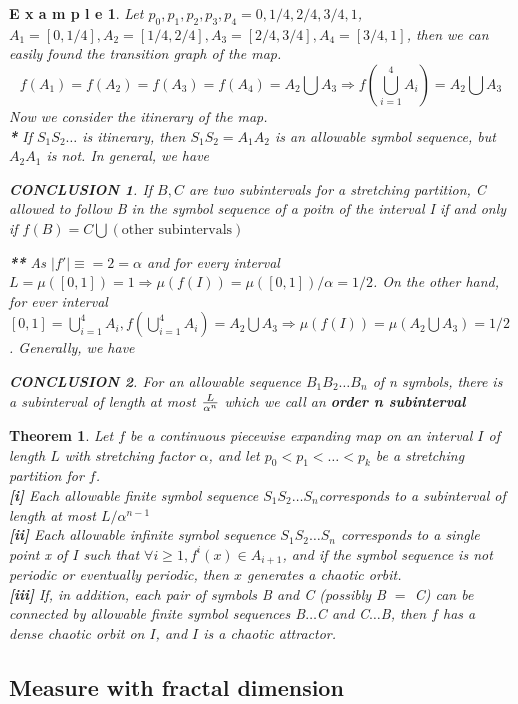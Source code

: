 \documentclass[12pt]{article}
\theoremstyle{plain}
\newtheorem{theorem}{\textbf{Theorem}}[section]
\newtheorem{example}{\textbf{E x a m p l e}}[section]
\newtheorem{conclusion}{\textit{\textbf{CONCLUSION}}}[section]
\begin{document}
\begin{example}
Let $p_0, p_1, p_2, p_3, p_4 = 0, 1/4, 2/4, 3/4, 1$, $A_1 = [0, 1/4], A_2 = [1/4, 2/4], A_3 = [2/4, 3/4], A_4 = [3/4, 1]$, then we can easily found the transition graph of the map.
$$
f(A_1) = f(A_2) = f(A_3) = f(A_4) = A_2 \bigcup A_3 \Rightarrow f\left(\bigcup_{i = 1}^{4}A_i\right) = A_2\bigcup A_3
$$
Now we consider the itinerary of the map.
\\\noindent \textbf{*} If $S_1S_2\ldots$ is itinerary, then $S_1S_2 = A_1A_2$ is an allowable symbol sequence, but $A_2A_1$ is not. In general, we have 
\begin{conclusion} If $B, C$ are two subintervals for a stretching partition, C allowed to follow B in the symbol sequence of a poitn of the interval I if and only if $f(B) = C \bigcup (\text{other subintervals})$
\end{conclusion}

  \noindent \textbf{**} As $|f'| \equiv = 2 = \alpha$ and for every interval $L = \mu([0, 1]) = 1 \Rightarrow \mu(f(I)) = \mu([0, 1])/\alpha = 1/2$. On the other hand, for ever interval $[0, 1] = \bigcup_{i = 1}^{4}A_i, f(\bigcup_{i = 1}^{4}A_i) = A_2 \bigcup A_3 \Rightarrow \mu(f(I)) = \mu(A_2\bigcup A_3) = 1/2$. Generally, we have 
\begin{conclusion} For an allowable sequence $B_1B_2\ldots B_n$ of n symbols, there is a subinterval of length at most $L \over \alpha^n$ which we call an \textbf{order n subinterval}
\end{conclusion}

\end{example}



\begin{theorem}Let $f$ be a continuous piecewise expanding map on an interval $I$ of length $L$ with stretching factor $\alpha$, and let $p_0 < p_1 < \ldots < p_k$ be a stretching partition for $f$.
\\\noindent \textbf{[i]} Each allowable finite symbol sequence $S_1S_2\ldots S_n$corresponds to a subinterval of length at most $L / \alpha^{n-1}$
\\\noindent \textbf{[ii]} Each allowable infinite symbol sequence $S_1S_2\ldots S_n$ corresponds to a single point x of $I$ such that $\forall i \geq 1, f^i(x) \in A_{i+1}$, and if the symbol sequence is not periodic or eventually periodic, then $x$ generates a chaotic orbit.
\\\noindent \textbf{[iii]} If, in addition, each pair of symbols B and C (possibly B $=$ C) can be connected by allowable finite symbol sequences B$\ldots$C and C$\ldots$B, then $f$ has a dense chaotic orbit on $I$, and $I$ is a chaotic attractor.
\end{theorem}










\subsection{Measure with fractal dimension}
\end{document}
